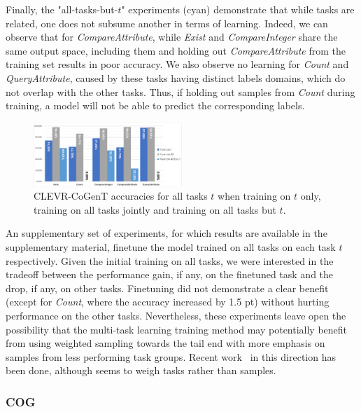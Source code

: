 Finally, the "all-tasks-but-$t$" experiments (cyan) demonstrate that while tasks are related, one does not subsume another in terms of learning. Indeed, we can observe that for \textit{CompareAttribute}, while \textit{Exist} and \textit{CompareInteger} share the same output space, including them and holding out \textit{CompareAttribute} from the training set results in poor accuracy. We also observe no learning for \textit{Count} and \textit{QueryAttribute}, caused by these tasks having distinct labels domains, which do not overlap with the other tasks. Thus, if holding out samples from \textit{Count} during training, a model will not be able to predict the corresponding labels.

\begin{figure}[!t]
	\centering
	\includegraphics[width=0.5\textwidth]{img/results/CoGenT_results.pdf}
	\caption{CLEVR-CoGenT accuracies for all tasks $t$ when training on $t$ only, training on all tasks jointly and training on all tasks but $t$.} %
	\label{fig:CoGenT-results}
\end{figure}

An supplementary set of experiments, for which results are available in the supplementary material,
finetune the model trained on all tasks on each task $t$ respectively. Given the initial training on all tasks, we were interested in the tradeoff between the performance gain, if any, on the finetuned task and the drop, if any, on other tasks. Finetuning did not demonstrate a clear benefit (except for \textit{Count}, where the accuracy increased by 1.5 pt) without hurting performance on the other tasks. Nevertheless, these experiments leave open the possibility that the multi-task learning training method may potentially benefit from using weighted sampling towards the tail end with more emphasis on samples from less performing task groups. Recent work~\cite{guo2018dynamic, kendall2018multi} in this direction has been done, although seems to weigh tasks rather than samples.

\subsubsection{COG}
\label{sec:reasoning-cog}


